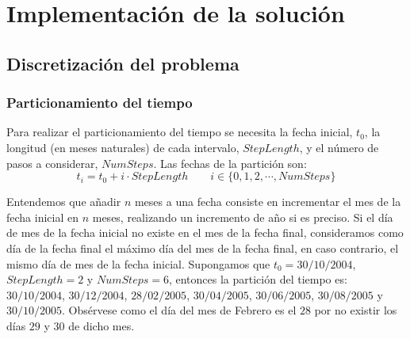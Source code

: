 
%
%
%
%
%
%
%
%

\chapter{Implementaci\'on de la soluci\'on}
\label{sec:implementation}

\section{Discretizaci\'on del problema}

\subsection{Particionamiento del tiempo}

Para realizar el particionamiento del tiempo se necesita la fecha inicial, $t_0$,
la longitud (en meses naturales) de cada intervalo, $StepLength$, y el n\'umero
de pasos a considerar, $NumSteps$. Las fechas de la partici\'on son:
\begin{displaymath}
t_i = t_0 + i \cdot StepLength \qquad i \in \{0, 1, 2, \cdots, NumSteps\}
\end{displaymath}

Entendemos que a\~nadir $n$ meses a una fecha consiste en incrementar el
mes de la fecha inicial en $n$ meses, realizando un incremento de a\~no si
es preciso. Si el d\'ia de mes de la fecha inicial no existe en el mes de
la fecha final, consideramos como d\'ia de la fecha final el m\'aximo d\'ia
del mes de la fecha final, en caso contrario, el mismo d\'ia de mes de la
fecha inicial.
\newline
\newline
Supongamos que $t_0=30/10/2004$, $StepLength=2$ y $NumSteps=6$, entonces la
partici\'on del tiempo es: $30/10/2004$, $30/12/2004$, $28/02/2005$, $30/04/2005$,
$30/06/2005$, $30/08/2005$ y $30/10/2005$. Obs\'ervese como el d\'ia del mes de
Febrero es el $28$ por no existir los d\'ias $29$ y $30$ de dicho mes.

